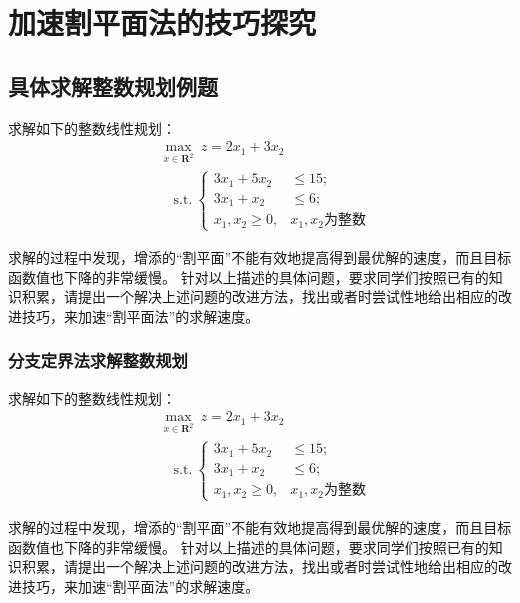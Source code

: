 	{\centering\chapter{加速割平面法的技巧探究}}

\section{具体求解整数规划例题}
求解如下的整数线性规划：
	\begin{equation}\label{Chapter2ExamILP}
		\begin{split}
			&\max_{x \in \mathbf{R}^{2}}~z = 2 x_1  + 3 x_2  \\
			& \quad \text{s.t.} ~
				\begin{cases}
					3x_1 + 5x_2 &\leq 15; \\
					3x_1 + x_2 &\leq 6;\\
					x_1, x_2 \geq 0, &x_1, x_2 \text{为整数} 
				\end{cases}
		\end{split}
	\end{equation}

求解的过程中发现，增添的“割平面”不能有效地提高得到最优解的速度，而且目标函数值也下降的非常缓慢。
针对以上描述的具体问题，要求同学们按照已有的知识积累，请提出一个解决上述问题的改进方法，找出或者时尝试性地给出相应的改进技巧，来加速“割平面法”的求解速度。

\subsection{分支定界法求解整数规划}

求解如下的整数线性规划：
	\begin{equation*} 
		\begin{split}
			&\max_{x \in \mathbf{R}^{2}}~z = 2 x_1  + 3 x_2  \\
			& \quad \text{s.t.} ~
				\begin{cases}
					3x_1 + 5x_2 &\leq 15; \\
					3x_1 + x_2 &\leq 6;\\
					x_1, x_2 \geq 0, &x_1, x_2 \text{为整数} 
				\end{cases}
		\end{split}
	\end{equation*}

求解的过程中发现，增添的“割平面”不能有效地提高得到最优解的速度，而且目标函数值也下降的非常缓慢。
针对以上描述的具体问题，要求同学们按照已有的知识积累，请提出一个解决上述问题的改进方法，找出或者时尝试性地给出相应的改进技巧，来加速“割平面法”的求解速度。


